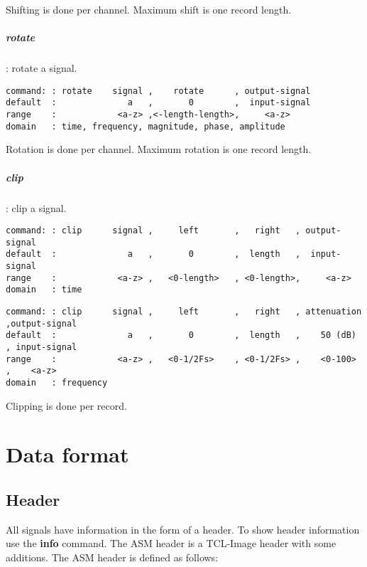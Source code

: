 \documentclass{report}
\newcommand{\bc}{\scriptsize}
\newcommand{\ec}{\normalsize}
\begin{document}
Shifting is done per channel.
Maximum shift is one record length.

\paragraph{rotate}: rotate a signal.

\bc
\begin{verbatim}
command: : rotate    signal ,    rotate      , output-signal
default  :              a   ,       0        ,  input-signal
range    :            <a-z> ,<-length-length>,     <a-z>
domain   : time, frequency, magnitude, phase, amplitude
\end{verbatim}
\ec

Rotation is done per channel.
Maximum rotation is one record length.

\paragraph{clip}: clip a signal.

\bc
\begin{verbatim}
command: : clip      signal ,     left       ,   right   , output-signal
default  :              a   ,       0        ,  length   ,  input-signal
range    :            <a-z> ,   <0-length>   , <0-length>,     <a-z>
domain   : time
\end{verbatim}
\ec

\bc
\begin{verbatim}
command: : clip      signal ,     left       ,   right   , attenuation ,output-signal
default  :              a   ,       0        ,  length   ,    50 (dB)  , input-signal
range    :            <a-z> ,   <0-1/2Fs>    , <0-1/2Fs> ,    <0-100>  ,    <a-z>
domain   : frequency
\end{verbatim}
\ec

Clipping is done per record.


\chapter{Data format}

\section{Header}\label{sec:header}

All signals have information in the form of a header. To show header
information use the \textbf{info} command. The ASM header is a
TCL-Image header with some additions. The ASM header is defined as follows:
\end{document}
